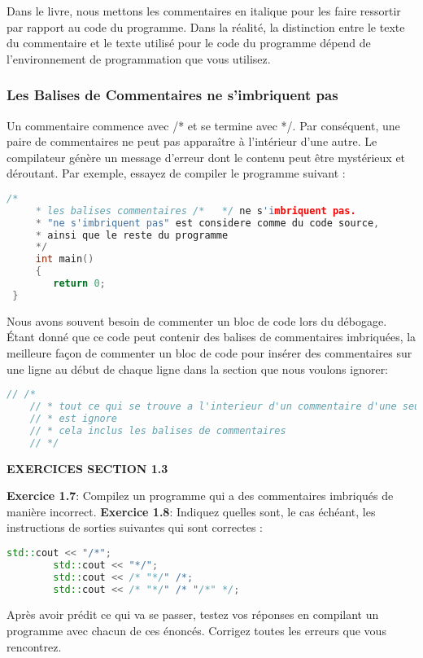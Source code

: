 \begin{shadebox}
	Dans le livre, nous mettons les commentaires en italique pour les faire ressortir par rapport au code du programme. Dans la réalité, la distinction entre le texte du commentaire et le texte utilisé pour le code du programme dépend de l'environnement de programmation que vous utilisez.
\end{shadebox}

\subsubsection{Les Balises de Commentaires ne s'imbriquent pas}
Un commentaire commence avec /* et se termine avec */. Par conséquent, une paire de commentaires ne peut pas apparaître à l'intérieur d'une autre. Le compilateur génère un message d'erreur dont le contenu peut être mystérieux et déroutant. Par exemple, essayez de compiler le programme suivant :

\medbreak
\begin{lstlisting}[language=C++]
	/*
	 * les balises commentaires /*   */ ne s'imbriquent pas.
	 * "ne s'imbriquent pas" est considere comme du code source,
	 * ainsi que le reste du programme
	 */
	 int main()
	 {
		return 0;	 
 }
\end{lstlisting}
\medbreak  

Nous avons souvent besoin de commenter un bloc de code lors du débogage. Étant donné que ce code peut contenir des balises de commentaires imbriquées, la meilleure façon de commenter un bloc de code pour insérer des commentaires sur une ligne au début de chaque ligne dans la section que nous voulons ignorer:

\medbreak
\begin{lstlisting}[language=C++]
	// /*
	// * tout ce qui se trouve a l'interieur d'un commentaire d'une seule ligne 
	// * est ignore
	// * cela inclus les balises de commentaires
	// */
\end{lstlisting}
\medbreak

\textbf{EXERCICES SECTION 1.3}
\begin{shadebox}
\textbf{Exercice 1.7}: Compilez un programme qui a des commentaires imbriqués de manière incorrect.
\textbf{Exercice 1.8}: Indiquez quelles sont, le cas échéant, les instructions de sorties suivantes qui sont correctes :
\medbreak
	\begin{lstlisting}[language=C++]
		std::cout << "/*";
		std::cout << "*/";
		std::cout << /* "*/" /*;
		std::cout << /* "*/" /* "/*" */;
	\end{lstlisting}
	\medbreak
	
	Après avoir prédit ce qui va se passer, testez vos réponses en compilant un programme avec chacun de ces énoncés. Corrigez toutes les erreurs que vous rencontrez.
	
\end{shadebox}

